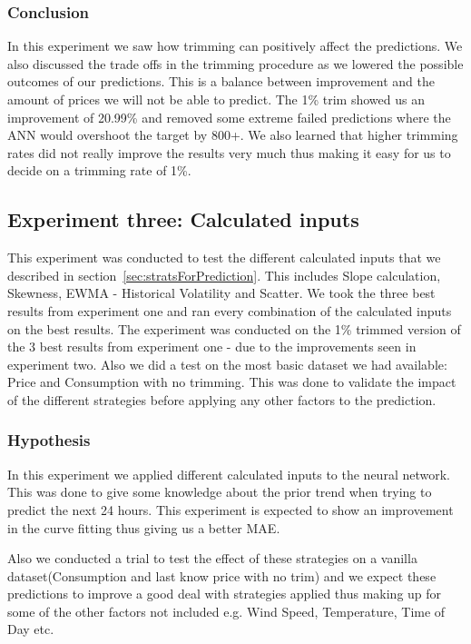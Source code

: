 \subsubsection{Conclusion}
In this experiment we saw how trimming can positively affect the predictions. We also discussed the trade offs in the trimming procedure as we lowered the possible outcomes of our predictions. This is a balance between improvement and the amount of prices we will not be able to predict. The 1\% trim showed us an improvement of 20.99\% and removed some extreme failed predictions where the ANN would overshoot the target by 800+. We also learned that higher trimming rates did not really improve the results very much thus making it easy for us to decide on a trimming rate of 1\%.

\newpage
\subsection{Experiment three: Calculated inputs}
\label{sec:priceExperimentThree}
This experiment was conducted to test the different calculated inputs that we described in section~\ref{sec:stratsForPrediction}. This includes Slope calculation, Skewness, EWMA - Historical Volatility and Scatter. We took the three best results from experiment one and ran every combination of the calculated inputs on the best results. The experiment was conducted on the 1\% trimmed version of the 3 best results from experiment one - due to the improvements seen in experiment two. Also we did a test on the most basic dataset we had available: Price and Consumption with no trimming. This was done to validate the impact of the different strategies before applying any other factors to the prediction.

\subsubsection{Hypothesis}
In this experiment we applied different calculated inputs to the neural network. This was done to give some knowledge about the prior trend when trying to predict the next 24 hours. This experiment is expected to show an improvement in the curve fitting thus giving us a better MAE.

Also we conducted a trial to test the effect of these strategies on a vanilla dataset(Consumption and last know price with no trim) and we expect these predictions to improve a good deal with strategies applied thus making up for some of the other factors not included e.g. Wind Speed, Temperature, Time of Day etc.

